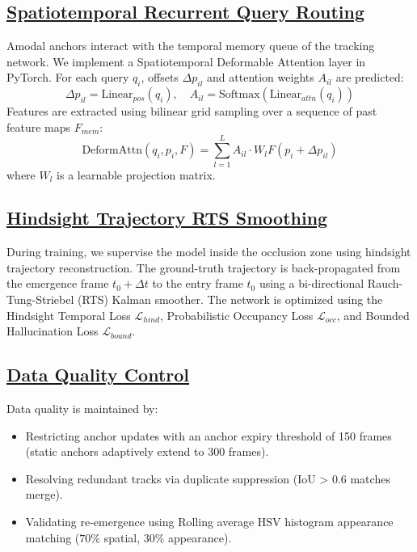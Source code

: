 \documentclass[12pt]{article}
\begin{document}
\subsection*{\underline{\textbf{Spatiotemporal Recurrent Query Routing}}}
Amodal anchors interact with the temporal memory queue of the tracking network. We implement a Spatiotemporal Deformable Attention layer in PyTorch. For each query $q_i$, offsets $\Delta p_{il}$ and attention weights $A_{il}$ are predicted:
\begin{equation}
\Delta p_{il} = \text{Linear}_{pos}(q_i), \quad A_{il} = \text{Softmax}(\text{Linear}_{attn}(q_i))
\end{equation}
Features are extracted using bilinear grid sampling over a sequence of past feature maps $F_{mem}$:
\begin{equation}
\text{DeformAttn}(q_i, p_i, F) = \sum_{l=1}^L A_{il} \cdot W_l F(p_i + \Delta p_{il})
\end{equation}
where $W_l$ is a learnable projection matrix.

\subsection*{\underline{\textbf{Hindsight Trajectory RTS Smoothing}}}
During training, we supervise the model inside the occlusion zone using hindsight trajectory reconstruction. The ground-truth trajectory is back-propagated from the emergence frame $t_0 + \Delta t$ to the entry frame $t_0$ using a bi-directional Rauch-Tung-Striebel (RTS) Kalman smoother. The network is optimized using the Hindsight Temporal Loss $\mathcal{L}_{hind}$, Probabilistic Occupancy Loss $\mathcal{L}_{occ}$, and Bounded Hallucination Loss $\mathcal{L}_{bound}$.

\subsection*{\underline{\textbf{Data Quality Control}}}
Data quality is maintained by:
\begin{itemize}
    \item Restricting anchor updates with an anchor expiry threshold of 150 frames (static anchors adaptively extend to 300 frames).
    \item Resolving redundant tracks via duplicate suppression (IoU > 0.6 matches merge).
    \item Validating re-emergence using Rolling average HSV histogram appearance matching ($70\%$ spatial, $30\%$ appearance).
\end{itemize}
\end{document}
